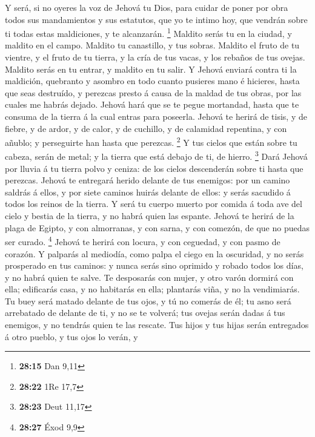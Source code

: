  Y será, si no oyeres la voz de Jehová tu Dios, para
cuidar de poner por obra todos sus mandamientos y sus estatutos, que yo
te intimo hoy, que vendrán sobre ti todas estas maldiciones, y te
alcanzarán. \footnote{\textbf{28:15} Dan 9,11}  Maldito
serás tu en la ciudad, y maldito en el campo.  Maldito tu
canastillo, y tus sobras.  Maldito el fruto de tu
vientre, y el fruto de tu tierra, y la cría de tus vacas, y los rebaños
de tus ovejas.  Maldito serás en tu entrar, y maldito en
tu salir.  Y Jehová enviará contra ti la maldición,
quebranto y asombro en todo cuanto pusieres mano é hicieres, hasta que
seas destruído, y perezcas presto á causa de la maldad de tus obras, por
las cuales me habrás dejado.  Jehová hará que se te pegue
mortandad, hasta que te consuma de la tierra á la cual entras para
poseerla.  Jehová te herirá de tisis, y de fiebre, y de
ardor, y de calor, y de cuchillo, y de calamidad repentina, y con
añublo; y perseguirte han hasta que perezcas. \footnote{\textbf{28:22}
  1Re 17,7}  Y tus cielos que están sobre tu cabeza,
serán de metal; y la tierra que está debajo de ti, de hierro.
\footnote{\textbf{28:23} Deut 11,17}  Dará Jehová por
lluvia á tu tierra polvo y ceniza: de los cielos descenderán sobre ti
hasta que perezcas.  Jehová te entregará herido delante
de tus enemigos: por un camino saldrás á ellos, y por siete caminos
huirás delante de ellos: y serás sacudido á todos los reinos de la
tierra.  Y será tu cuerpo muerto por comida á toda ave
del cielo y bestia de la tierra, y no habrá quien las espante.
 Jehová te herirá de la plaga de Egipto, y con
almorranas, y con sarna, y con comezón, de que no puedas ser curado.
\footnote{\textbf{28:27} Éxod 9,9}  Jehová te herirá con
locura, y con ceguedad, y con pasmo de corazón.  Y
palparás al mediodía, como palpa el ciego en la oscuridad, y no serás
prosperado en tus caminos: y nunca serás sino oprimido y robado todos
los días, y no habrá quien te salve.  Te desposarás con
mujer, y otro varón dormirá con ella; edificarás casa, y no habitarás en
ella; plantarás viña, y no la vendimiarás.  Tu buey será
matado delante de tus ojos, y tú no comerás de él; tu asno será
arrebatado de delante de ti, y no se te volverá; tus ovejas serán dadas
á tus enemigos, y no tendrás quien te las rescate.  Tus
hijos y tus hijas serán entregados á otro pueblo, y tus ojos lo verán, y
